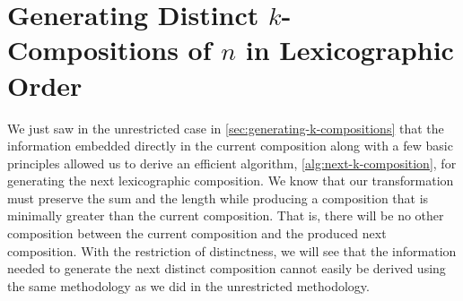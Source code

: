 \section{Generating Distinct $k$-Compositions of $n$ in Lexicographic Order}
\label{sec:distinct-case}

We just saw in the unrestricted case in \cref{sec:generating-k-compositions} that the information embedded directly in the current composition along with a few basic principles allowed us to derive an efficient algorithm, \cref{alg:next-k-composition}, for generating the next lexicographic composition. We know that our transformation must preserve the sum and the length while producing a composition that is minimally greater than the current composition. That is, there will be no other composition between the current composition and the produced next composition. With the restriction of distinctness, we will see that the information needed to generate the next distinct composition cannot easily be derived using the same methodology as we did in the unrestricted methodology.


